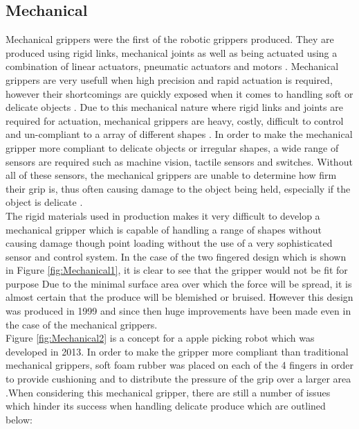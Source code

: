 \documentclass[11pt]{article}
\begin{document}
\subsection{Mechanical}
Mechanical grippers were the first of the robotic grippers produced. They are produced using rigid links, mechanical joints as well as being actuated using a combination of linear actuators, pneumatic actuators and motors \cite{marchese2015recipe}. Mechanical grippers are very usefull when high precision and rapid actuation is required, however their shortcomings are quickly exposed when it comes to handling soft or delicate objects \cite{ilievski2011soft}. Due to this mechanical nature where rigid links and joints are required for actuation, mechanical grippers are heavy, costly, difficult to control and un-compliant to a array of different shapes \cite{martinez2014soft}. In order to make the mechanical gripper more compliant to delicate objects or irregular shapes, a wide range of sensors are required such as machine vision, tactile sensors and switches. Without all of these sensors, the mechanical grippers are unable to determine how firm their grip is, thus often causing damage to the object being held, especially if the object is delicate \cite{ceccarelli2000designing}.
\\
\newline
The rigid materials used in production makes it very difficult to develop a mechanical gripper which is capable of handling a range of shapes without causing damage though point loading without the use of a very sophisticated sensor and control system. In the case of the two fingered design which is shown in Figure \ref{fig:Mechanical1}, it is clear to see that the gripper would not be fit for purpose Due to the minimal surface area over which the force will be spread, it is almost certain that the produce will be blemished or bruised. However this design was produced in 1999 and since then huge improvements have been made even in the case of the mechanical grippers. 
\\
\newline
Figure \ref{fig:Mechanical2} is a concept for a apple picking robot which was developed in 2013. In order to make the gripper more compliant than traditional mechanical grippers, soft foam rubber was placed on each of the 4 fingers in order to provide cushioning and to distribute the pressure of the grip over a larger area \cite{chiu2013development}.When considering this mechanical gripper, there are still a number of issues which hinder its success when handling delicate produce which are outlined below:
\end{document}
